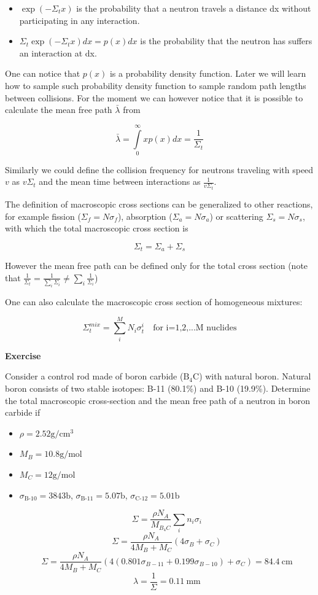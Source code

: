 \begin{itemize}
\item $\exp(-\Sigma_t x)$ is the probability that a neutron travels a distance dx without participating in any interaction.
\item $\Sigma_t \exp(-\Sigma_t x)dx=p(x)dx$ is the probability that the neutron has suffers an interaction at dx.
\end{itemize}

One can notice that $p(x)$ is a probability density function. Later we will learn how to sample such probability density function to sample random path lengths between collisions. For the moment we can however notice that it is possible to calculate the mean free path $\bar\lambda$ from

\[
\bar\lambda=\int\limits_0^\infty xp(x)dx=\frac{1}{\Sigma_t}
\]

Similarly we could define the collision frequency for neutrons traveling with speed $v$ as $v\Sigma_t$ and the mean time between interactions as $\frac{1}{v\Sigma_t}$.

The definition of macroscopic cross sections can be generalized to other reactions, for example fission ($\Sigma_f=N\sigma_f$), absorption ($\Sigma_a=N\sigma_a$) or scattering $\Sigma_s=N\sigma_s$, with which the total macroscopic cross section is

\[
\Sigma_t=\Sigma_a+\Sigma_s
\]

However the mean free path can be defined only for the total cross section (note that $\frac{1}{\Sigma_t} = \frac{1}{\sum\limits_i \Sigma_i}\neq \sum\limits_i\frac{1}{\Sigma_i}$)

One can also calculate the macroscopic cross section of homogeneous mixtures:

\[
\Sigma_t^{mix}=\sum\limits_i^M N_i\sigma_t^i \quad \text{for i=1,2,...M nuclides}
\]

\begin{tcolorbox}
\textbf{Exercise}

Consider a control rod made of boron carbide ($\text{B}_4\text{C}$) with natural boron. Natural boron consists of two stable isotopes: B-11 (80.1\%) and B-10 (19.9\%). Determine the total macroscopic cross-section and the mean free path of a neutron in boron carbide if
\begin{itemize}
\item $\rho = 2.52\text{g}/\text{cm}^3$
\item $M_B = 10.8\text{g}/\text{mol}$
\item $M_C = 12\text{g}/\text{mol}$
\item $\sigma_{\text{B-10}}=3843 \text{b}$, $\sigma_{\text{B-11}}=5.07 \text{b}$, $\sigma_{\text{C-12}}=5.01 \text{b}$

$$\Sigma=\frac{\rho N_A}{M_{B_4C}}\sum_in_i\sigma_i$$
$$\Sigma=\frac{\rho N_A}{4M_{B}+M_{C}}(4\sigma_B+\sigma_C)$$
$$\Sigma=\frac{\rho N_A}{4M_{B}+M_{C}}(4(0.801\sigma_{B-11}+0.199\sigma_{B-10})+\sigma_C)=84.4 \: \text{cm}$$
$$\lambda=\frac{1}{\Sigma}=0.11\:\text{mm}$$
\end{itemize}
 \end{tcolorbox}


